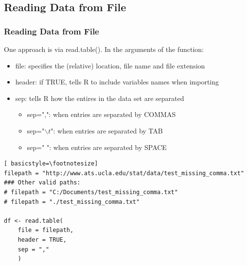 \subsection{Reading Data from File}

\begin{frame}
 \frametitle{Reading Data from File}

One approach is via \ttfamily read.table(). \normalfont  In the arguments of the function:
  \begin{itemize}
  \item \ttfamily file: \normalfont specifies the (relative) location, file name and file extension
  \item \ttfamily header: \normalfont if TRUE, tells R to include variables names when importing
  \item \ttfamily sep: \normalfont tells R how the entires in the data set are separated
    \begin{itemize}
      \item \ttfamily sep=",": \normalfont when entries are separated by COMMAS
      \item \ttfamily sep="$\backslash t$":\normalfont \hspace{2.5pt} when entries are separated by TAB
      \item \ttfamily sep=" ": \normalfont when entries are separated by SPACE
    \end{itemize}
   \end{itemize}

\newpage   
   	\begin{lstlisting}[ basicstyle=\footnotesize]
filepath = "http://www.ats.ucla.edu/stat/data/test_missing_comma.txt"
### Other valid paths:
# filepath = "C:/Documents/test_missing_comma.txt"
# filepath = "./test_missing_comma.txt"

df <- read.table(
	file = filepath, 
	header = TRUE, 
	sep = ","
	)
	\end{lstlisting}
\normalfont
\normalsize
\end{frame}

